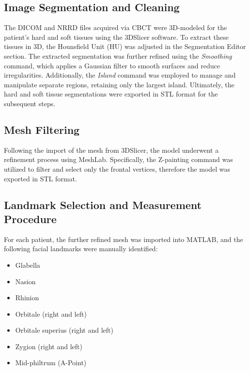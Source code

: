\documentclass[journal,article,submit,pdftex,moreauthors]{Definitions/mdpi}
\begin{document}
\subsection{Image Segmentation and Cleaning}

The DICOM and NRRD files acquired via CBCT were 3D-modeled for the patient’s hard and soft tissues using the 3DSlicer software. To extract these tissues in 3D, the Hounsfield Unit (HU) %
was adjusted in the Segmentation Editor section. The extracted segmentation was further refined using the \textit{Smoothing} command, which applies a Gaussian filter to smooth surfaces and reduce irregularities. Additionally, the \textit{Island} command was employed to manage and manipulate separate regions, retaining only the largest island.
Ultimately, the hard and soft tissue segmentations were exported in STL format for the subsequent steps.

\subsection{Mesh Filtering}

Following the import of the mesh from 3DSlicer, the model underwent a refinement process using MeshLab. Specifically, the Z-painting command was utilized to filter and select only the frontal vertices, therefore the model was exported in STL format.

\subsection{Landmark Selection and Measurement Procedure}
For each patient, the further refined mesh was imported into MATLAB, and the following facial landmarks were manually identified:
\begin{itemize}
    \item Glabella
    \item Nasion
    \item Rhinion
    \item Orbitale (right and left)
    \item Orbitale superius (right and left)
    \item Zygion (right and left)
    \item Mid-philtrum (A-Point)
\end{itemize}
\end{document}
